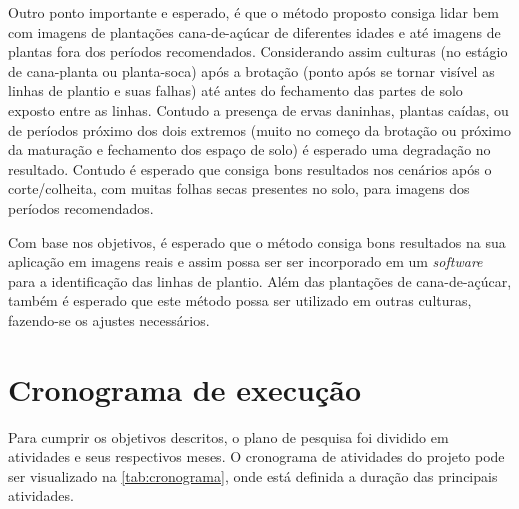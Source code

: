 \documentclass[12pt, a4paper, english, brazil]{article}
\begin{document}
Outro ponto importante e esperado, é que o método proposto consiga lidar bem com imagens de plantações cana-de-açúcar de diferentes idades e até imagens de plantas fora dos períodos recomendados. Considerando assim culturas (no estágio de cana-planta ou planta-soca) após a brotação (ponto após se tornar visível as linhas de plantio e suas falhas) até antes do fechamento das partes de solo exposto entre as linhas. Contudo a presença de ervas daninhas, plantas caídas, ou de períodos próximo dos dois extremos (muito no começo da brotação ou próximo da maturação e fechamento dos espaço de solo) é esperado uma degradação no resultado. Contudo é esperado que consiga bons resultados nos cenários após o corte/colheita, com muitas folhas secas presentes no solo, para imagens dos períodos recomendados.

Com base nos objetivos, é esperado que o método consiga bons resultados na sua aplicação em imagens reais e assim possa ser ser incorporado em um \textit{software} para a identificação das linhas de plantio. Além das plantações de cana-de-açúcar, também é esperado que este método possa ser utilizado em outras culturas, fazendo-se os ajustes necessários.


\section{Cronograma de execução}

Para cumprir os objetivos descritos, o plano de pesquisa foi dividido em atividades e seus respectivos meses. O cronograma de atividades do projeto pode ser visualizado na \autoref{tab:cronograma}, onde está definida a
duração das principais atividades.
\end{document}
